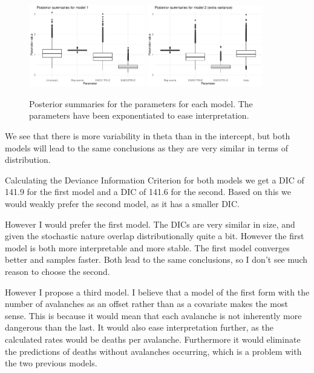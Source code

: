 \documentclass[10pt]{extarticle}
\begin{document}
\begin{figure}[H]
	\includegraphics[width = 0.45\textwidth]{../psmod1}
	\includegraphics[width = 0.45\textwidth]{../psmod2}
	\caption{Posterior summaries for the parameters for each model. The parameters have been exponentiated to ease interpretation.}
	\label{fig:postsummods}
\end{figure}
We see that there is more variability in theta than in the intercept, but both models will lead to the same conclusions as they are very similar in terms of distribution. 

Calculating the Deviance Information Criterion for both models we get a DIC of 141.9 for the first model and a DIC of 141.6 for the second. Based on this we would weakly prefer the second model, as it has a smaller DIC. 

However I would prefer the first model. The DICs are very similar in size, and given the stochastic nature overlap distributionally quite a bit. However the first model is both more interpretable and more stable. The first model converges better and samples faster. Both lead to the same conclusions, so I don't see much reason to choose the second. 

However I propose a third model. I believe that a model of the first form with the number of avalanches as an offset rather than as a covariate makes the most sense. This is because it would mean that each avalanche is not inherently more dangerous than the last. It would also ease interpretation further, as the calculated rates would be deaths per avalanche. Furthermore it would eliminate the predictions of deaths without avalanches occurring, which is a problem with the two previous models. 
\end{document}
